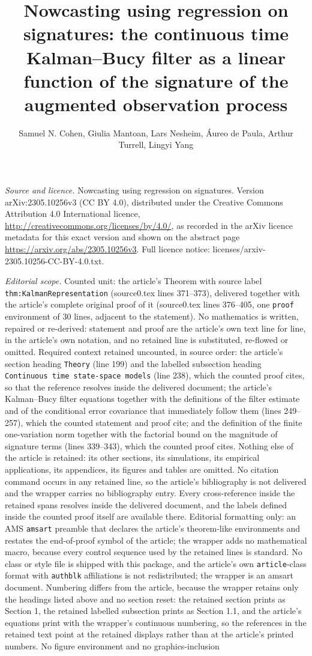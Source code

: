 \documentclass[10pt,a4paper]{amsart}
\title[The Kalman--Bucy filter as a linear function of the signature]{Nowcasting using regression on signatures: the continuous time Kalman--Bucy filter as a linear function of the signature of the augmented observation process}
\author{Samuel N. Cohen, Giulia Mantoan, Lars Nesheim, \'{A}ureo de Paula, Arthur Turrell, Lingyi Yang}
\theoremstyle{plain}
\theoremstyle{remark}
\begin{document}
\maketitle
\noindent\emph{Source and licence.} Nowcasting using regression on signatures. Version arXiv:2305.10256v3 (CC BY 4.0), distributed under the Creative Commons Attribution 4.0 International licence, \url{http://creativecommons.org/licenses/by/4.0/}, as recorded in the arXiv licence metadata for this exact version and shown on the abstract page \url{https://arxiv.org/abs/2305.10256v3}. Full licence notice: licenses/arxiv-2305.10256-CC-BY-4.0.txt.\par\smallskip

\noindent\textit{Editorial scope.} Counted unit: the article's Theorem with source label \texttt{thm:KalmanRepresentation} (source0.tex lines 371--373), delivered together with the article's complete original proof of it (source0.tex lines 376--405, one \texttt{proof} environment of 30 lines, adjacent to the statement). No mathematics is written, repaired or re-derived: statement and proof are the article's own text line for line, in the article's own notation, and no retained line is substituted, re-flowed or omitted. Required context retained uncounted, in source order: the article's section heading \texttt{Theory} (line 199) and the labelled subsection heading \texttt{Continuous time state-space models} (line 238), which the counted proof cites, so that the reference resolves inside the delivered document; the article's Kalman--Bucy filter equations together with the definitions of the filter estimate and of the conditional error covariance that immediately follow them (lines 249--257), which the counted statement and proof cite; and the definition of the finite one-variation norm together with the factorial bound on the magnitude of signature terms (lines 339--343), which the counted proof cites. Nothing else of the article is retained: its other sections, its simulations, its empirical applications, its appendices, its figures and tables are omitted. No citation command occurs in any retained line, so the article's bibliography is not delivered and the wrapper carries no bibliography entry. Every cross-reference inside the retained spans resolves inside the delivered document, and the labels defined inside the counted proof itself are available there. Editorial formatting only: an AMS \texttt{amsart} preamble that declares the article's theorem-like environments and restates the end-of-proof symbol of the article; the wrapper adds no mathematical macro, because every control sequence used by the retained lines is standard. No class or style file is shipped with this package, and the article's own \texttt{article}-class format with \texttt{authblk} affiliations is not redistributed; the wrapper is an amsart document. Numbering differs from the article, because the wrapper retains only the headings listed above and no section reset: the retained section prints as Section 1, the retained labelled subsection prints as Section 1.1, and the article's equations print with the wrapper's continuous numbering, so the references in the retained text point at the retained displays rather than at the article's printed numbers. No figure environment and no graphics-inclusion 
\end{document}
